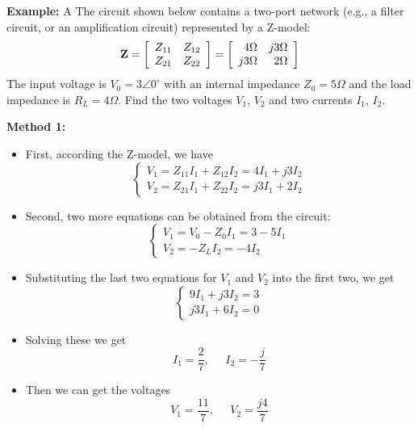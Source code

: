 \documentclass{article}
\begin{document}

{\bf Example:} A The circuit shown below contains a two-port network (e.g., a 
filter circuit, or an amplification circuit) represented by a Z-model:
\begin{equation} 
  {\bf Z}=\left[\begin{array}{ll} Z_{11} & Z_{12} \\ 
      Z_{21} & Z_{22} \end{array}\right]
  =\left[\begin{array}{rr} 4\Omega & j3\Omega \\ 
      j3\Omega & 2\Omega \end{array}\right]	
\end{equation}
The input voltage is $V_0=3\angle 0^\circ$ with an internal impedance 
$Z_0=5\Omega$ and the load impedance is $R_L=4\Omega$. Find the two voltages 
$V_1$, $V_2$ and two currents $I_1$, $I_2$.


{\bf Method 1:} 
\begin{itemize}
\item First, according the Z-model, we have
  \begin{equation}
    \left\{ \begin{array}{l} V_1=Z_{11}I_1+Z_{12}I_2= 4I_1+j3I_2 \\
      V_2=Z_{21}I_1+Z_{22}I_2=j3I_1+ 2I_2 \end{array} \right.	
  \end{equation}
\item Second, two more equations can be obtained from the circuit:
  \begin{equation}
    \left\{ \begin{array}{l} V_1=V_0-Z_0 I_1=3-5I_1 \\
      V_2=-Z_L I_2=-4 I_2 \end{array} \right.	
  \end{equation}
\item Substituting the last two equations for $V_1$ and $V_2$ into the 
  first two, we get
  \begin{equation}
    \left\{ \begin{array}{l} 9I_1+j3I_2=3 \\ j3I_1+6I_2=0 \end{array} \right. 
  \end{equation}
\item Solving these we get 
  \begin{equation}
    I_1=\frac{2}{7},\;\;\;\;\;I_2=-\frac{j}{7} 
  \end{equation}
\item Then we can get the voltages
  \begin{equation}
    V_1=\frac{11}{7},\;\;\;\;\;V_2=\frac{j4}{7} 
  \end{equation}
\end{itemize}
\end{document}
